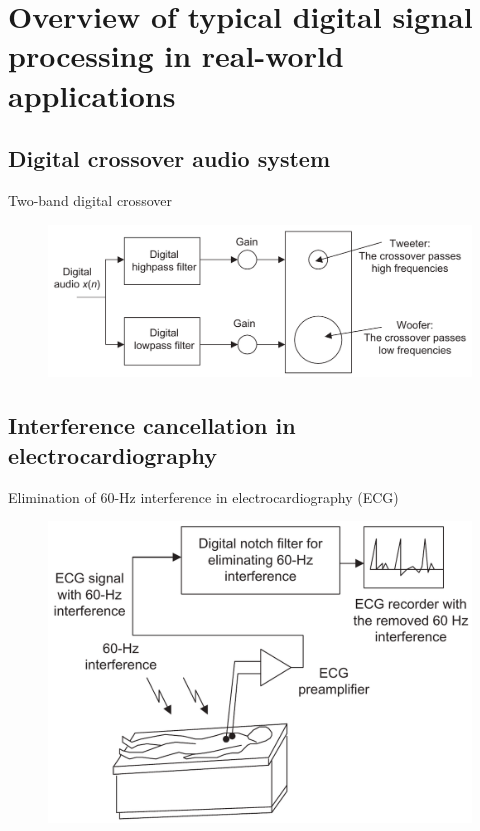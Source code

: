 \documentclass[pdflatex,compress,mathserif]{beamer}
\begin{document}
\section{Overview of typical digital signal processing in real-world applications}

\subsection{Digital crossover audio system}

\begin{frame}{Two-band digital crossover}
	\begin{figure}
		\includegraphics[width=0.8\linewidth]{img/img07}
	\end{figure}
\end{frame}

\subsection{Interference cancellation in electrocardiography}

\begin{frame}{Elimination of 60-Hz interference in electrocardiography (ECG)}
	\begin{figure}
		\includegraphics[width=0.8\linewidth]{img/img08}
	\end{figure}
\end{frame}
\end{document}
